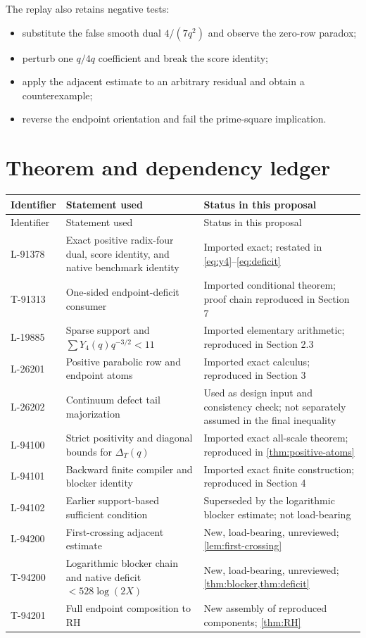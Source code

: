 \documentclass[11pt]{article}
\newcommand{\Yfour}{Y_4}
\begin{document}
The replay also retains negative tests:
\begin{itemize}
\item substitute the false smooth dual $4/(7q^2)$ and observe the zero-row paradox;
\item perturb one $q/4q$ coefficient and break the score identity;
\item apply the adjacent estimate to an arbitrary residual and obtain a counterexample;
\item reverse the endpoint orientation and fail the prime-square implication.
\end{itemize}

\section{Theorem and dependency ledger}

\begin{longtable}{p{}p{}p{}}
\toprule
Identifier & Statement used & Status in this proposal\\
\midrule
\endfirsthead
\toprule
Identifier & Statement used & Status in this proposal\\
\midrule
\endhead
L-91378 & Exact positive radix-four dual, score identity, and native benchmark identity & Imported exact; restated in \cref{eq:y4}--\cref{eq:deficit}\\
T-91313 & One-sided endpoint-deficit consumer & Imported conditional theorem; proof chain reproduced in Section 7\\
L-19885 & Sparse support and $\sum\Yfour(q)q^{-3/2}<11$ & Imported elementary arithmetic; reproduced in Section 2.3\\
L-26201 & Positive parabolic row and endpoint atoms & Imported exact calculus; reproduced in Section 3\\
L-26202 & Continuum defect tail majorization & Used as design input and consistency check; not separately assumed in the final inequality\\
L-94100 & Strict positivity and diagonal bounds for $\Delta_T(q)$ & Imported exact all-scale theorem; reproduced in \cref{thm:positive-atoms}\\
L-94101 & Backward finite compiler and blocker identity & Imported exact finite construction; reproduced in Section 4\\
L-94102 & Earlier support-based sufficient condition & Superseded by the logarithmic blocker estimate; not load-bearing\\
L-94200 & First-crossing adjacent estimate & New, load-bearing, unreviewed; \cref{lem:first-crossing}\\
T-94200 & Logarithmic blocker chain and native deficit $<528\log(2X)$ & New, load-bearing, unreviewed; \cref{thm:blocker,thm:deficit}\\
T-94201 & Full endpoint composition to RH & New assembly of reproduced components; \cref{thm:RH}\\
\bottomrule
\end{longtable}
\end{document}

